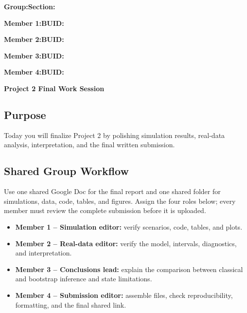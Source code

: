 \documentclass{article}
\newcommand{\projecttitle}{Project 2 Final Work Session}
\newcommand{\blankline}{\underline{\phantom{XXXXXXXXXXXXXXXXXXXXXXXX}}}
\newcommand{\blankid}{\underline{\phantom{XXXXXXXXXXXXXXX}}}
\begin{document}
\noindent\textbf{Group:}\blankline{}\hfill\textbf{Section:}\blankid{}

\medskip
\noindent\textbf{Member 1:}\blankline{}\hfill\textbf{BUID:}\blankid{}

\medskip
\noindent\textbf{Member 2:}\blankline{}\hfill\textbf{BUID:}\blankid{}

\medskip
\noindent\textbf{Member 3:}\blankline{}\hfill\textbf{BUID:}\blankid{}

\medskip
\noindent\textbf{Member 4:}\blankline{}\hfill\textbf{BUID:}\blankid{}

\begin{center}
  {\Large \textbf{\projecttitle{}}}
\end{center}

\subsection*{Purpose}
Today you will finalize Project 2 by polishing simulation results, real-data analysis, interpretation, and the final written submission.

\subsection*{Shared Group Workflow}
Use one shared Google Doc for the final report and one shared folder for simulations, data, code, tables, and figures. Assign the four roles below; every member must review the complete submission before it is uploaded.
\begin{itemize}[itemsep=.25em]
  \item \textbf{Member 1 -- Simulation editor:} verify scenarios, code, tables, and plots.
  \item \textbf{Member 2 -- Real-data editor:} verify the model, intervals, diagnostics, and interpretation.
  \item \textbf{Member 3 -- Conclusions lead:} explain the comparison between classical and bootstrap inference and state limitations.
  \item \textbf{Member 4 -- Submission editor:} assemble files, check reproducibility, formatting, and the final shared link.
\end{itemize}
\end{document}
